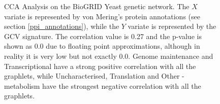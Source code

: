 \begin{figure}[H]
\begin{tabular}{ c c | c c }
\end{tabular}
\caption[CCA Analysis on the BioGRID Yeast genetic network -- von Mering's annotations]{CCA Analysis on the BioGRID Yeast genetic network. The $X$ variate is represented by von Mering's protein annotations (see section \ref{ppi_annotations}), while the $Y$ variate is represented by the GCV signature. The correlation value is 0.27 and the p-value is shown as 0.0 due to floating point approximations, although in reality it is very low but not exactly 0.0. Genome maintenance and Transcriptional have a strong positive correlation with all the graphlets, while Uncharacterised, Translation and Other - metabolism have the strongest negative correlation with all the graphlets.}
\label{all_ppi13}
\end{figure}











